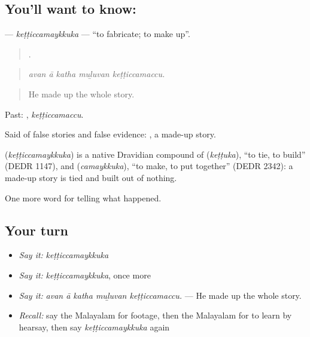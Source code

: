 \subsection*{You'll want to know: }
\textbf{} — \emph{keṭṭiccamaykkuka} — \textquotedblleft{}to fabricate; to make up\textquotedblright{}.

\begin{quote}
    .
\end{quote}

\begin{quote}
\emph{avan ā katha muḻuvan keṭṭiccamaccu.}
\end{quote}

\begin{quote}
He made up the whole story.
\end{quote}

Past: , \emph{keṭṭiccamaccu}.

Said of false stories and false evidence:  , a made-up story.

\begin{cousinweb}
\textbf{} (\emph{keṭṭiccamaykkuka}) is a native Dravidian compound of  (\emph{keṭṭuka}), \textquotedblleft{}to tie, to build\textquotedblright{} (DEDR 1147), and  (\emph{camaykkuka}), \textquotedblleft{}to make, to put together\textquotedblright{} (DEDR 2342): a made-up story is tied and built out of nothing.
\end{cousinweb}

\begin{grammarlens}[title={What you've built}]
One more word for telling what happened.
\end{grammarlens}

\subsection*{Your turn}
\begin{itemize}
\raggedright
  \item \emph{Say it:} \emph{keṭṭiccamaykkuka}
  \item \emph{Say it:} \emph{keṭṭiccamaykkuka}, once more
  \item \emph{Say it:} \emph{avan ā katha muḻuvan keṭṭiccamaccu.} — He made up the whole story.
  \item \emph{Recall:} say the Malayalam for footage, then the Malayalam for to learn by hearsay, then say \emph{keṭṭiccamaykkuka} again
\end{itemize}

